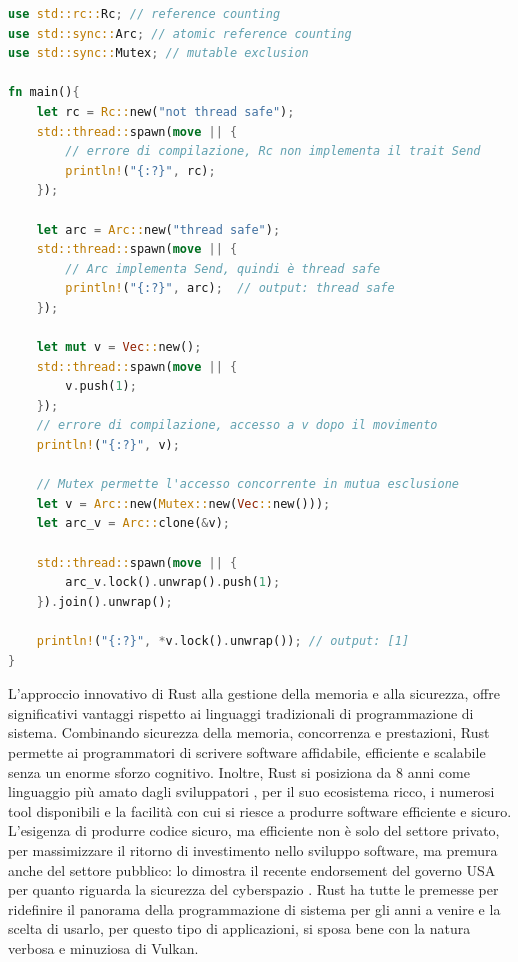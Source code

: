 \vspace{5mm}
\begin{lstlisting}[language=Rust, caption=Fearless concurrency, label=lis:rust_fearless_concurrency]
use std::rc::Rc; // reference counting
use std::sync::Arc; // atomic reference counting
use std::sync::Mutex; // mutable exclusion

fn main(){
    let rc = Rc::new("not thread safe");
    std::thread::spawn(move || {
        // errore di compilazione, Rc non implementa il trait Send
        println!("{:?}", rc);
    });

    let arc = Arc::new("thread safe");
    std::thread::spawn(move || {
        // Arc implementa Send, quindi è thread safe
        println!("{:?}", arc);  // output: thread safe
    });

    let mut v = Vec::new();
    std::thread::spawn(move || {
        v.push(1);
    });
    // errore di compilazione, accesso a v dopo il movimento
    println!("{:?}", v);

    // Mutex permette l'accesso concorrente in mutua esclusione
    let v = Arc::new(Mutex::new(Vec::new()));
    let arc_v = Arc::clone(&v);

    std::thread::spawn(move || {
        arc_v.lock().unwrap().push(1);
    }).join().unwrap();

    println!("{:?}", *v.lock().unwrap()); // output: [1]
}
\end{lstlisting}
\vspace{5mm}

L'approccio innovativo di Rust alla gestione della memoria e alla sicurezza, offre significativi vantaggi rispetto ai linguaggi tradizionali di programmazione di sistema. Combinando sicurezza della memoria, concorrenza e prestazioni, Rust permette ai programmatori di scrivere software affidabile, efficiente e scalabile senza un enorme sforzo cognitivo. Inoltre, Rust si posiziona da 8 anni come linguaggio più amato dagli sviluppatori \cite[]{Rust:love}, per il suo ecosistema ricco, i numerosi tool disponibili e la facilità con cui si riesce a produrre software efficiente e sicuro. L'esigenza di produrre codice sicuro, ma efficiente non è solo del settore privato, per massimizzare il ritorno di investimento nello sviluppo software, ma premura anche del settore pubblico: lo dimostra il recente endorsement del governo USA per quanto riguarda la sicurezza del cyberspazio \cite[]{Gov:rust_use}. Rust ha tutte le premesse per ridefinire il panorama della programmazione di sistema per gli anni a venire e la scelta di usarlo, per questo tipo di applicazioni, si sposa bene con la natura verbosa e minuziosa di Vulkan.
